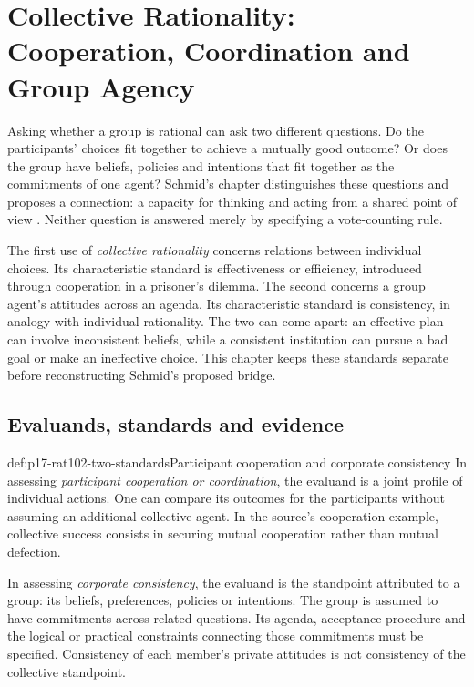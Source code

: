 \chapter{Collective Rationality: Cooperation, Coordination and Group Agency}
\label{sec:p17-rationality-10-2}

Asking whether a group is rational can ask two different questions. Do the
participants' choices fit together to achieve a mutually good outcome? Or
does the group have beliefs, policies and intentions that fit together as
the commitments of one agent? Schmid's chapter distinguishes these questions
and proposes a connection: a capacity for thinking and acting from a shared
point of view \parencite[pp.~591--599]{Schmid2021CollectiveRationality}.
Neither question is answered merely by specifying a vote-counting rule.

The first use of \emph{collective rationality} concerns relations between
individual choices. Its characteristic standard is effectiveness or
efficiency, introduced through cooperation in a prisoner's dilemma.
The second concerns a group agent's attitudes across an agenda. Its
characteristic standard is consistency, in analogy with individual
rationality. The two can come apart: an effective plan can involve
inconsistent beliefs, while a consistent institution can pursue a bad goal
or make an ineffective choice. This chapter keeps these standards separate
before reconstructing Schmid's proposed bridge.

\section{Evaluands, standards and evidence}
\label{sec:p17-rat102-standards}

\begin{hbdefinition}{def:p17-rat102-two-standards}{Participant cooperation and corporate consistency}
In assessing \emph{participant cooperation or coordination}, the evaluand
is a joint profile of individual actions. One can compare its outcomes for
the participants without assuming an additional collective agent. In the
source's cooperation example, collective success consists in securing mutual
cooperation rather than mutual defection.

In assessing \emph{corporate consistency}, the evaluand is the standpoint
attributed to a group: its beliefs, preferences, policies or intentions.
The group is assumed to have commitments across related questions. Its
agenda, acceptance procedure and the logical or practical constraints
connecting those commitments must be specified. Consistency of each
member's private attitudes is not consistency of the collective standpoint.
\end{hbdefinition}


